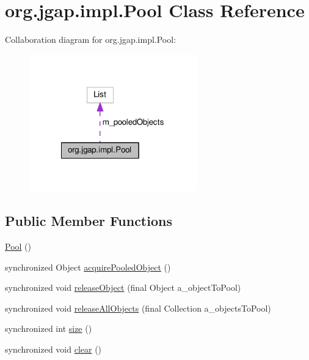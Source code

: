\hypertarget{classorg_1_1jgap_1_1impl_1_1_pool}{\section{org.\-jgap.\-impl.\-Pool Class Reference}
\label{classorg_1_1jgap_1_1impl_1_1_pool}
}


Collaboration diagram for org.\-jgap.\-impl.\-Pool\-:
\nopagebreak
\begin{figure}[H]
\begin{center}
\leavevmode
\includegraphics[width=206pt]{classorg_1_1jgap_1_1impl_1_1_pool__coll__graph}
\end{center}
\end{figure}
\subsection*{Public Member Functions}
\begin{DoxyCompactItemize}
\item 
\hyperlink{classorg_1_1jgap_1_1impl_1_1_pool_a6a98590fd1c845e1b4c41941f6febf8c}{Pool} ()
\item 
synchronized Object \hyperlink{classorg_1_1jgap_1_1impl_1_1_pool_a84ab7ce249536f638b0ec873f47cd72a}{acquire\-Pooled\-Object} ()
\item 
synchronized void \hyperlink{classorg_1_1jgap_1_1impl_1_1_pool_a7b979b8c659166d5e01b985698074cb0}{release\-Object} (final Object a\-\_\-object\-To\-Pool)
\item 
synchronized void \hyperlink{classorg_1_1jgap_1_1impl_1_1_pool_a1006cf50190e8be37fe21e3030b46060}{release\-All\-Objects} (final Collection a\-\_\-objects\-To\-Pool)
\item 
synchronized int \hyperlink{classorg_1_1jgap_1_1impl_1_1_pool_a22f44a20fa8f6867604a9c2d39fbc16a}{size} ()
\item 
synchronized void \hyperlink{classorg_1_1jgap_1_1impl_1_1_pool_abdd9e34abe2f0f485bc2b364b0fab9b6}{clear} ()
\end{DoxyCompactItemize}
